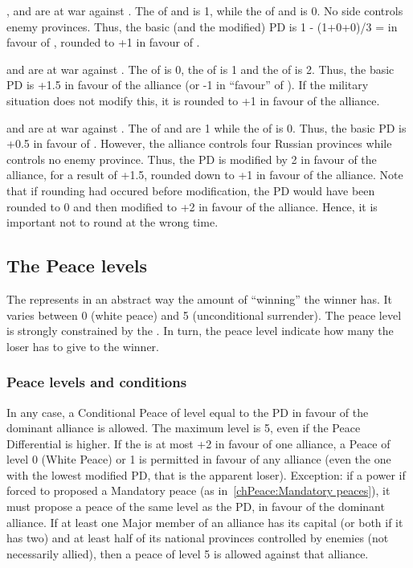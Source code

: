\begin{exemple}[Rounding PD]
  \SUE, \POL and \TUR are at war against \RUS. The \STAB of \RUS and \SUE is
  1, while the \STAB of \POL and \TUR is 0. No side controls enemy
  provinces. Thus, the basic (and the modified) PD is 1 - (1+0+0)/3 = \td in
  favour of \RUS, rounded to +1 in favour of \RUS.
  
  \smallskip

  \SUE and \TUR are at war against \RUS. The \STAB of \RUS is 0, the \STAB of
  \TUR is 1 and the \STAB of \SUE is 2. Thus, the basic PD is +1.5 in favour
  of the alliance (or -1 in ``favour'' of \RUS). If the military situation
  does not modify this, it is rounded to +1 in favour of the alliance.

  \smallskip

  \SUE and \TUR are at war against \RUS. The \STAB of \RUS and \TUR are 1
  while the \STAB of \SUE is 0. Thus, the basic PD is +0.5 in favour of
  \RUS. However, the alliance controls four Russian provinces while \RUS
  controls no enemy province. Thus, the PD is modified by 2 in favour of the
  alliance, for a result of +1.5, rounded down to +1 in favour of the
  alliance. Note that if rounding had occured before modification, the PD
  would have been rounded to 0 and then modified to +2 in favour of the
  alliance. Hence, it is important not to round at the wrong time.
\end{exemple}

\subsection{The Peace levels}
The  represents in an abstract way the amount of
``winning'' the winner has. It varies between 0 (white peace) and 5
(unconditional surrender). The peace level is strongly constrained by the
. In turn, the peace level indicate how many
 the loser has to give to the winner.

\subsubsection{Peace levels and conditions}
\bparag In any case, a Conditional Peace of level equal to the PD in favour of
the dominant alliance is allowed. The maximum level is 5, even if the Peace
Differential is higher.
\bparag If the  is at most +2 in favour of one
alliance, a Peace of level 0 (White Peace) or 1 is permitted in favour of any
alliance (even the one with the lowest modified PD, that is the apparent
loser).
\bparag Exception: if a power if forced to proposed a Mandatory peace (as
in~\ref{chPeace:Mandatory peaces}), it must propose a peace of the same level
as the PD, in favour of the dominant alliance.
\bparag If at least one Major member of an alliance has its capital (or both
if it has two) and at least half of its national provinces controlled by
enemies (not necessarily allied), then a peace of level 5 is allowed against
that alliance.

